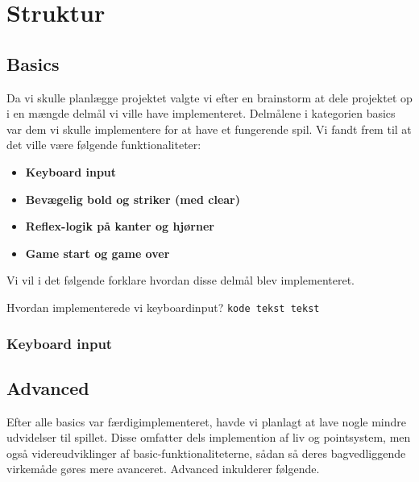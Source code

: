 \chapter{Struktur}
\section{Basics}
Da vi skulle planlægge projektet valgte vi efter en brainstorm at dele projektet op i en mængde delmål vi ville have implementeret. Delmålene i kategorien basics var dem vi skulle implementere for at have et fungerende spil. Vi fandt frem til at det ville være følgende funktionaliteter:
\begin{itemize}
\item \textbf{Keyboard input}
\item \textbf{Bevægelig bold og striker (med clear)}
\item \textbf{Reflex-logik på kanter og hjørner}
\item \textbf{Game start og game over}
\end{itemize}
Vi vil i det følgende forklare hvordan disse delmål blev implementeret. 

Hvordan implementerede vi keyboardinput?
\texttt{kode tekst tekst}

\subsection{Keyboard input}


\section{Advanced}
Efter alle basics var færdigimplementeret, havde vi planlagt at lave nogle mindre udvidelser til spillet. Disse omfatter dels implemention af liv og pointsystem, men også videreudviklinger af basic-funktionaliteterne, sådan så deres bagvedliggende virkemåde gøres mere avanceret. Advanced inkulderer følgende.

